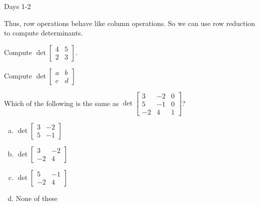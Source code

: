 \begin{applicationActivities}{Days 1-2}
\begin{observation}
  Thus, row operations behave like column operations.  So we can use row reduction to compute determinants.
\end{observation}

\begin{activity}
  Compute $\det \begin{bmatrix} 4 & 5 \\ 2 & 3 \end{bmatrix}$.
\end{activity}

\begin{activity}
  Compute $\det \begin{bmatrix} a & b \\ c & d \end{bmatrix}$
\end{activity}

\begin{activity}
  Which of the following is the same as $\det \begin{bmatrix} 3 & -2 & 0 \\  5 & -1 & 0 \\  -2 & 4 & 1\end{bmatrix}$?
\begin{enumerate}[(a)]
\item $\det \begin{bmatrix} 3 & -2 \\ 5 & -1 \end{bmatrix}$
\item $\det \begin{bmatrix} 3 & -2 \\ -2 & 4 \end{bmatrix}$
\item $\det \begin{bmatrix} 5 & -1 \\ -2 & 4 \end{bmatrix}$
\item None of these
\end{enumerate}
\end{activity}


\end{applicationActivities}
